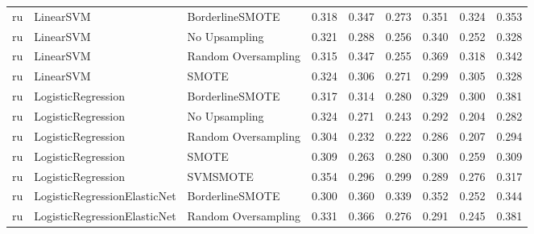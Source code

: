 \begin{tabular}{lllllllll}
      ru &                    LinearSVM &     BorderlineSMOTE & 0.318 &                     0.347 &                 0.273 &                  0.351 &                                   0.324 &     0.353 \\
      ru &                    LinearSVM &       No Upsampling & 0.321 &                     0.288 &                 0.256 &                  0.340 &                                   0.252 &     0.328 \\
      ru &                    LinearSVM & Random Oversampling & 0.315 &                     0.347 &                 0.255 &                  0.369 &                                   0.318 &     0.342 \\
      ru &                    LinearSVM &               SMOTE & 0.324 &                     0.306 &                 0.271 &                  0.299 &                                   0.305 &     0.328 \\
      ru &           LogisticRegression &     BorderlineSMOTE & 0.317 &                     0.314 &                 0.280 &                  0.329 &                                   0.300 &     0.381 \\
      ru &           LogisticRegression &       No Upsampling & 0.324 &                     0.271 &                 0.243 &                  0.292 &                                   0.204 &     0.282 \\
      ru &           LogisticRegression & Random Oversampling & 0.304 &                     0.232 &                 0.222 &                  0.286 &                                   0.207 &     0.294 \\
      ru &           LogisticRegression &               SMOTE & 0.309 &                     0.263 &                 0.280 &                  0.300 &                                   0.259 &     0.309 \\
      ru &           LogisticRegression &            SVMSMOTE & 0.354 &                     0.296 &                 0.299 &                  0.289 &                                   0.276 &     0.317 \\
      ru & LogisticRegressionElasticNet &     BorderlineSMOTE & 0.300 &                     0.360 &                 0.339 &                  0.352 &                                   0.252 &     0.344 \\
      ru & LogisticRegressionElasticNet & Random Oversampling & 0.331 &                     0.366 &                 0.276 &                  0.291 &                                   0.245 &     0.381 \\

\end{tabular}
